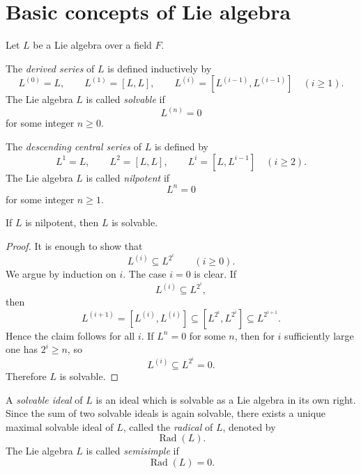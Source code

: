 \section{Basic concepts of Lie algebra}

Let \(L\) be a Lie algebra over a field \(F\).

\begin{definition}
    The \emph{derived series} of \(L\) is defined inductively by
    \[
        L^{(0)}=L, \qquad L^{(1)}=[L,L], \qquad L^{(i)}=[L^{(i-1)},L^{(i-1)}]\quad (i\ge 1).
    \]
    The Lie algebra \(L\) is called \emph{solvable} if
    \[
        L^{(n)}=0
    \]
    for some integer \(n\ge 0\).
\end{definition}

\begin{definition}
    The \emph{descending central series} of \(L\) is defined by
    \[
        L^1=L, \qquad L^2=[L,L], \qquad L^i=[L,L^{i-1}]\quad (i\ge 2).
    \]
    The Lie algebra \(L\) is called \emph{nilpotent} if
    \[
        L^n=0
    \]
    for some integer \(n\ge 1\).
\end{definition}

\begin{proposition}
    If \(L\) is nilpotent, then \(L\) is solvable.
\end{proposition}

\begin{proof}
    It is enough to show that
    \[
        L^{(i)}\subseteq L^{2^i}\qquad (i\ge 0).
    \]
    We argue by induction on \(i\). The case \(i=0\) is clear. If
    \[
        L^{(i)}\subseteq L^{2^i},
    \]
    then
    \[
        L^{(i+1)}
        =
        [L^{(i)},L^{(i)}]
        \subseteq
        [L^{2^i},L^{2^i}]
        \subseteq
        L^{2^{i+1}}.
    \]
    Hence the claim follows for all \(i\). If \(L^n=0\) for some \(n\), then for \(i\) sufficiently large one has \(2^i\ge n\), so
    \[
        L^{(i)}\subseteq L^{2^i}=0.
    \]
    Therefore \(L\) is solvable.
\end{proof}

\begin{definition}
    A \emph{solvable ideal} of \(L\) is an ideal which is solvable as a Lie algebra in its own right. Since the sum of two solvable ideals is again solvable, there exists a unique maximal solvable ideal of \(L\), called the \emph{radical} of \(L\), denoted by
    \[
        \operatorname{Rad}(L).
    \]
    The Lie algebra \(L\) is called \emph{semisimple} if
    \[
        \operatorname{Rad}(L)=0.
    \]
\end{definition}

